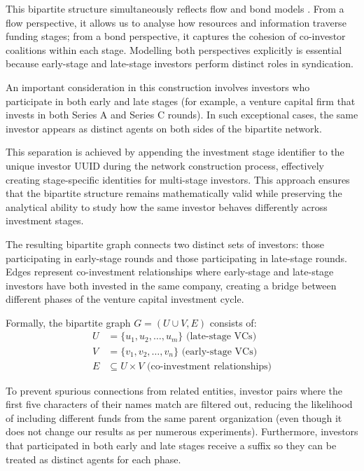 This bipartite structure simultaneously reflects flow and bond models \cite{Borgatti2009}. From a flow perspective, it allows us to analyse how resources and information traverse funding stages; from a bond perspective, it captures the cohesion of co-investor coalitions within each stage. Modelling both perspectives explicitly is essential because early-stage and late-stage investors perform distinct roles in syndication.

An important consideration in this construction involves investors who participate in both early and late stages (for example, a venture capital firm that invests in both Series A and Series C rounds). In such exceptional cases, the same investor appears as distinct agents on both sides of the bipartite network. 

This separation is achieved by appending the investment stage identifier to the unique investor UUID during the network construction process, effectively creating stage-specific identities for multi-stage investors. This approach ensures that the bipartite structure remains mathematically valid while preserving the analytical ability to study how the same investor behaves differently across investment stages.

The resulting bipartite graph connects two distinct sets of investors: those participating in early-stage rounds and those participating in late-stage rounds. Edges represent co-investment relationships where early-stage and late-stage investors have both invested in the same company, creating a bridge between different phases of the venture capital investment cycle.

Formally, the bipartite graph $G = (U \cup V, E)$ consists of:
\begin{align}
U &= \{u_1, u_2, \ldots, u_m\} \text{ (late-stage VCs)} \\
V &= \{v_1, v_2, \ldots, v_n\} \text{ (early-stage VCs)} \\
E &\subseteq U \times V \text{ (co-investment relationships)}
\end{align}

To prevent spurious connections from related entities, investor pairs where the first five characters of their names match are filtered out, reducing the likelihood of including different funds from the same parent organization (even though it does not change our results as per numerous experiments). Furthermore, investors that participated in both early and late stages receive a suffix so they can be treated as distinct agents for each phase.

